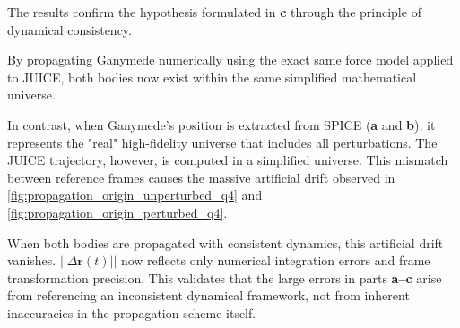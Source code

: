\documentclass{report}
\begin{document}

The results confirm the hypothesis formulated in \textbf{c} through the principle of dynamical consistency. 

By propagating Ganymede numerically using the exact same force model applied to JUICE, both bodies now exist within the same simplified mathematical universe. 

In contrast, when Ganymede's position is extracted from SPICE (\textbf{a} and \textbf{b}), it represents the "real" high-fidelity universe that includes all perturbations. The JUICE trajectory, however, is computed in a simplified universe. This mismatch between reference frames causes the massive artificial drift observed in \ref{fig:propagation_origin_unperturbed_q4} and \ref{fig:propagation_origin_perturbed_q4}.

When both bodies are propagated with consistent dynamics, this artificial drift vanishes. $||\Delta \mathbf{r}(t)||$ now reflects only numerical integration errors and frame transformation precision. This validates that the large errors in parts \textbf{a--c} arise from referencing an inconsistent dynamical framework, not from inherent inaccuracies in the propagation scheme itself.
\end{document}
